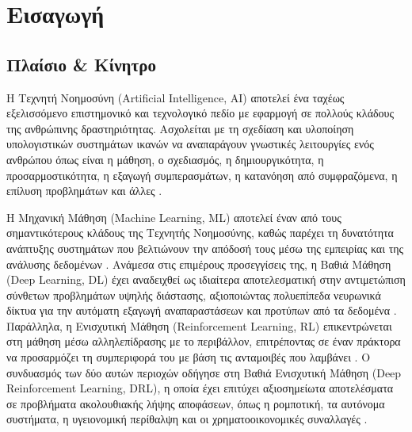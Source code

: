 



\chapter{Εισαγωγή}

\section{Πλαίσιο \& Κίνητρο}
Η Τεχνητή Νοημοσύνη (Artificial Intelligence, AI) αποτελεί ένα ταχέως εξελισσόμενο 
επιστημονικό και τεχνολογικό πεδίο με εφαρμογή σε πολλούς κλάδους της ανθρώπινης 
δραστηριότητας. Ασχολείται με τη σχεδίαση και υλοποίηση υπολογιστικών συστημάτων 
ικανών να αναπαράγουν γνωστικές λειτουργίες ενός ανθρώπου όπως είναι η μάθηση, 
ο σχεδιασμός, η δημιουργικότητα, η προσαρμοστικότητα, η εξαγωγή συμπερασμάτων, 
η κατανόηση από συμφραζόμενα, η επίλυση προβλημάτων και άλλες \cite{russell2020ai, jordan2015ml}.

Η Μηχανική Μάθηση (Machine Learning, ML) αποτελεί έναν από τους σημαντικότερους 
κλάδους της Τεχνητής Νοημοσύνης, καθώς παρέχει τη δυνατότητα ανάπτυξης συστημάτων 
που βελτιώνουν την απόδοσή τους μέσω της εμπειρίας και της ανάλυσης δεδομένων 
\cite{mitchell1997}. Ανάμεσα στις επιμέρους προσεγγίσεις της, η Βαθιά Μάθηση 
(Deep Learning, DL) έχει αναδειχθεί ως ιδιαίτερα αποτελεσματική στην αντιμετώπιση 
σύνθετων προβλημάτων υψηλής διάστασης, αξιοποιώντας πολυεπίπεδα νευρωνικά δίκτυα 
για την αυτόματη εξαγωγή αναπαραστάσεων και προτύπων από τα δεδομένα 
\cite{lecun2015deeplearning}. Παράλληλα, η Ενισχυτική Μάθηση 
(Reinforcement Learning, RL) επικεντρώνεται στη μάθηση μέσω αλληλεπίδρασης 
με το περιβάλλον, επιτρέποντας σε έναν πράκτορα να προσαρμόζει τη συμπεριφορά 
του με βάση τις ανταμοιβές που λαμβάνει \cite{sutton2018rl}. 
Ο συνδυασμός των δύο αυτών περιοχών οδήγησε στη Βαθιά Ενισχυτική Μάθηση 
(Deep Reinforcement Learning, DRL), η οποία έχει επιτύχει αξιοσημείωτα 
αποτελέσματα σε προβλήματα ακολουθιακής λήψης αποφάσεων, όπως η ρομποτική,
τα αυτόνομα συστήματα, η υγειονομική περίθαλψη και οι χρηματοοικονομικές
συναλλαγές \cite{arulkumaran2017drlsurvey, yu2021healthcare, kober2013robotics}.

